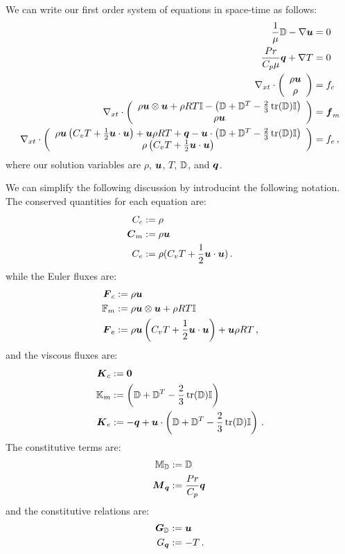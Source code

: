 \documentclass[Dissertation.tex]{subfiles}
\begin{document}
We can write our first order system of equations in space-time as follows:
\begin{subequations}
\label{eq:compressibleNSFirstOrder}
\begin{align}
	\frac{1}{\mu}\mathbb{D}-\nabla\boldsymbol u&=0\\
	\frac{Pr}{C_p\mu}\boldsymbol q+\nabla T&=0\\
	\nabla_{xt}\cdot\left( \begin{array}{c} \rho\boldsymbol u\\ \rho\\ \end{array} \right)&=f_c\\
	\nabla_{xt}\cdot\left( \begin{array}{c} \rho\boldsymbol u\otimes\boldsymbol u+\rho RT\mathbb{I}-\left( \mathbb{D}+\mathbb{D}^T-\frac{2}{3}\operatorname*{tr}(\mathbb{D})\mathbb{I} \right)\\ \rho\boldsymbol u\\ \end{array} \right)&=\boldsymbol f_m\\
	\nabla_{xt}\cdot\left( \begin{array}{c} \rho\boldsymbol u\left( C_v T+\frac{1}{2}\boldsymbol u\cdot\boldsymbol u \right)+\boldsymbol u\rho RT+\boldsymbol q
	-\boldsymbol u\cdot\left( \mathbb{D}+\mathbb{D}^T-\frac{2}{3}\operatorname*{tr}(\mathbb{D})\mathbb{I} \right)\\ \rho\left( C_v T+\frac{1}{2}\boldsymbol u\cdot\boldsymbol u \right)\\ \end{array} \right)&=f_e\,,
\end{align}
\end{subequations}
where our solution variables are $\rho$, $\boldsymbol u$, $T$, $\mathbb{D}$, and $\boldsymbol q$.

We can simplify the following discussion by introducint the following notation. 
The conserved quantities for each equation are:
\begin{align*}
C_c&:=\rho\\
\boldsymbol C_m&:=\rho\boldsymbol u\\
C_e&:=\rho(C_v T+\frac{1}{2}\boldsymbol u\cdot\boldsymbol u)\,.
\end{align*}
while the Euler fluxes are:
\begin{align*}
\boldsymbol F_c&:=\rho\boldsymbol u\\
\mathbb{F}_m&:=\rho\boldsymbol u\otimes\boldsymbol u+\rho RT\mathbb{I}\\
\boldsymbol F_e&:=\rho\boldsymbol u\left( C_v T+\frac{1}{2}\boldsymbol u\cdot\boldsymbol u \right)+\boldsymbol u\rho RT\,,
\end{align*}
and the viscous fluxes are:
\begin{align*}
\boldsymbol K_c&:=\boldsymbol 0\\
\mathbb{K}_m&:=\left( \mathbb{D}+\mathbb{D}^T-\frac{2}{3}\operatorname*{tr}(\mathbb{D})\mathbb{I} \right)\\
\boldsymbol K_e&:=-\boldsymbol q+\boldsymbol u\cdot\left( \mathbb{D}+\mathbb{D}^T-\frac{2}{3}\operatorname*{tr}(\mathbb{D})\mathbb{I} \right)\,.
\end{align*}
The constitutive terms are:
\begin{align*}
\mathbb{M}_{\mathbb{D}}&:=\mathbb{D}\\
\boldsymbol M_{\boldsymbol q}&:=\frac{Pr}{C_p}\boldsymbol q\,
\end{align*}
and the constitutive relations are:
\begin{align*}
\boldsymbol G_{\mathbb{D}}&:=\boldsymbol u\\
G_{\boldsymbol q}&:=-T\,.
\end{align*}
\end{document}
